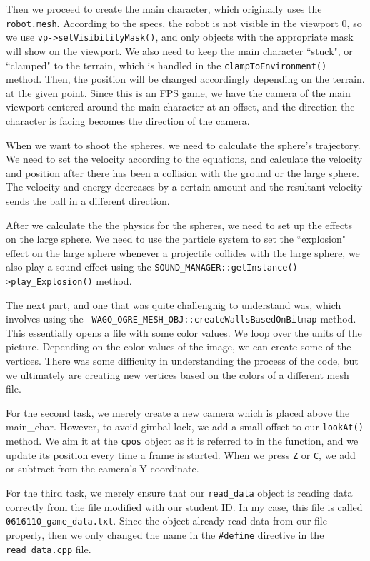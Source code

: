 \documentclass{article}
\begin{document}
	Then we proceed to create the main character, which originally uses the \texttt{robot.mesh}. According to the 
	specs, the robot is not visible in the viewport 0, so we use \texttt{vp->setVisibilityMask()}, and only 
	objects with the appropriate mask will show on the viewport. We also need to keep the main character ``stuck",
	or ``clamped" to the terrain, which is handled in the \texttt{clampToEnvironment()} method. Then, the position
	will be changed accordingly depending on the terrain. at the given point. Since this is an FPS game, we have the
	camera of the main viewport centered around the main character at an offset, and the direction the character
	is facing becomes the direction of the camera. 

	When we want to shoot the spheres, we need to calculate the sphere's trajectory. We need to set the velocity 
	according to the equations, and calculate the velocity and position after there has been a collision with the
	ground or the large sphere. The velocity and energy decreases by a certain amount and the resultant velocity 
	sends the ball in a different direction.

	After we calculate the the physics for the spheres, we need to set up the effects on the large sphere. We need to
	use the particle system to set the ``explosion" effect on the large sphere whenever a projectile collides with the 
	large sphere, we also play a sound effect using the \texttt{SOUND\_MANAGER::getInstance()->play\_Explosion()} method. 

	The next part, and one that was quite challengnig to understand was, which involves using the \texttt{
	WAGO\_OGRE\_MESH\_OBJ::createWallsBasedOnBitmap} method. This essentially opens a file with some color values. We loop
	over the units of the picture.  Depending on the color values of the image, we can create some of the vertices. There 
	was some difficulty in understanding the process of the code, but we ultimately  are creating new vertices based on the
	colors of a different mesh file.

	For the second task, we merely create a new camera which is placed above the main\_char. However, to avoid gimbal lock,
	we add a small offset to our \texttt{lookAt()} method. We aim it at the \texttt{cpos} object as it is referred to in the 
	function, and we update its position every time a frame is started. When we press \texttt{Z} or \texttt{C}, we add or 
	subtract from the camera's Y coordinate.

	For the third task, we merely ensure that our \texttt{read\_data} object is reading data correctly from the file modified
	with our student ID. In my case, this file is called \texttt{0616110\_game\_data.txt}. Since the object already read 
	data from our file properly, then we only changed the name in the \texttt{\#define} directive in the \texttt{read\_data.cpp}
	file.
\end{document}
